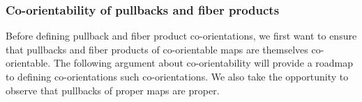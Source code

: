 \begin{comment}
BCOMMENT
 \red{Again, isn't the point that we don't know $\gamma$, so how can we fix the diagram to commute and then use that to determine $\gamma$? I think the idea is that we really need to say that the first diagram somehow determines this diagram via some conventions (what are those?). Then we know what the maps on the right are because that's just the tensor product of co-orientations of $V$ and $W$. On the left we know $i$ since that's canonical somehow (we still need to look up a good reference for that), and then all these other things determine a unique $\gamma$ so that the diagram commutes. This $\gamma$ is our co-orientation for $P$. So I think this all needs to be clarified.}
 Any such set of choices then yields
 a definition of pullback co-orientation through a diagram chase.  In concrete terms, fix a local orientation $\beta_M$ of $M$, and then
 use the co-orientations of $f$ and $g$ to identify compatible local orientations $\beta_V$ of $V$ and $\beta_W$ of $W$.  A fixed identification
 of the normal bundle of $\Delta M$ with the tangent bundle of $M$ then gives a $\beta_{\nu P \subset V \times W}$ which corresponds to $\beta_M$.
 The pullback co-orientation of the map $P \to M$ can then be defined pair $\beta_M$ with  a
 local orientation $\beta_P$ of $P$ so that $\beta_P \otimes \beta_{\nu P \subset V \times W}$ maps to $\beta_V \otimes \beta_W$ under
 the top horizontal isomorphism of Equation~\ref{co-or stuff}.
 ECOMMENT

  In order to obtain these properties we will develop additional structure to control  the
 isomorphisms in Diagram~\eqref{co-or stuff}.  We do this first by working at the level of vector spaces and linear maps over a point before expanding to local definitions and then
  back to the global level.


\end{comment}




\subsubsection{Co-orientability of pullbacks and fiber products}

Before defining pullback and fiber product co-orientations, we first want to ensure that pullbacks and fiber products of co-orientable maps are themselves co-orientable. The following argument about co-orientability will  provide a roadmap to defining co-orientations such co-orientations. We also take the opportunity to observe that pullbacks of proper maps are proper.

